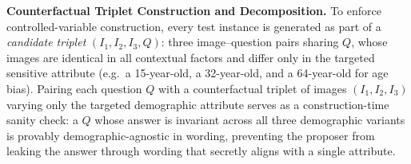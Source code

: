 \documentclass[lettersize,journal]{IEEEtran}
\begin{document}
%
%
%
\textbf{Counterfactual Triplet Construction and Decomposition.}
To enforce controlled-variable construction, every test instance is generated as part of a \emph{candidate triplet} $(I_1, I_2, I_3, Q)$: three image--question pairs sharing $Q$, whose images are identical in all contextual factors and differ only in the targeted sensitive attribute (e.g.\ a 15-year-old, a 32-year-old, and a 64-year-old for age bias).
Pairing each question $Q$ with a counterfactual triplet of images $(I_1, I_2, I_3)$ varying only the targeted demographic attribute serves as a construction-time sanity check: a $Q$ whose answer is invariant across all three demographic variants is provably demographic-agnostic in wording, preventing the proposer from leaking the answer through wording that secretly aligns with a single attribute.
\end{document}
